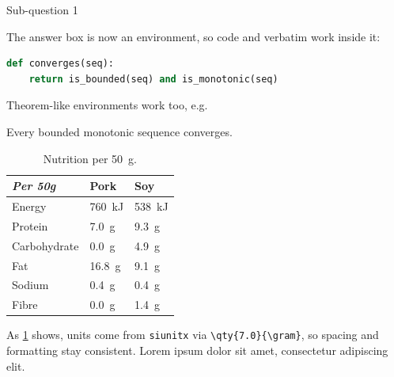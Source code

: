 \documentclass[11pt]{article}
\begin{document}
\maketitle
\thispagestyle{empty}

\begin{question}


\begin{subquestion}{Sub-question 1}
\begin{answer}
	The answer box is now an environment, so code and verbatim work inside it:
	\begin{lstlisting}[language=Python]
def converges(seq):
    return is_bounded(seq) and is_monotonic(seq)
	\end{lstlisting}
	Theorem-like environments work too, e.g.
	\begin{theorem}
		Every bounded monotonic sequence converges.
	\end{theorem}
\end{answer}
\end{subquestion}
\end{question}

\begin{question}

\begin{table}[h]
	\centering
	\begin{tabular}{l l l}
		\toprule
		\textit{Per 50g} & Pork & Soy \\
		\midrule
		Energy & \qty{760}{\kilo\joule} & \qty{538}{\kilo\joule}\\
		Protein & \qty{7.0}{\gram} & \qty{9.3}{\gram}\\
		Carbohydrate & \qty{0.0}{\gram} & \qty{4.9}{\gram}\\
		Fat & \qty{16.8}{\gram} & \qty{9.1}{\gram}\\
		Sodium & \qty{0.4}{\gram} & \qty{0.4}{\gram}\\
		Fibre & \qty{0.0}{\gram} & \qty{1.4}{\gram}\\
		\bottomrule
	\end{tabular}
	\caption{Nutrition per \qty{50}{\gram}.}\label{tab:nutrition}
\end{table}

\begin{answer}
As \cref{tab:nutrition} shows, units come from \texttt{siunitx} via \verb|\qty{7.0}{\gram}|, so spacing and formatting stay consistent. Lorem ipsum dolor sit amet, consectetur adipiscing elit.
\end{answer}

\end{question}
\end{document}
